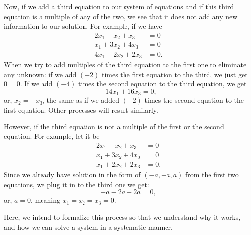 \documentclass[main.tex]{subfiles}
\begin{document}
Now, if we add a third equation to our system of equations and if this third equation is a multiple of any of the two, we see that it does not add any new information to our solution. For example, if we have 
$$\begin{aligned} 2 x_1-x_2+x_3 & =0 \\ 
x_1+3 x_2+4 x_3 & =0\\
4 x_1-2x_2+2x_3 & =0.
\end{aligned}$$
When we try to add multiples of the third equation to the first one to eliminate any unknown: if we add $(-2)$ times the first equation to the third, we just get $0 = 0$. If we add $(-4)$ times the second equation to the third equation, we get
$$
-14x_1+16 x_3=0,
$$
or, $x_2=-x_3$, the same as if we added $(-2)$ times the second equation to the first equation. Other processes will result similarly. 

However, if the third equation is not a multiple of the first or the second equation. For example, let it be 
$$\begin{aligned} 2 x_1-x_2+x_3 & =0 \\ 
x_1+3 x_2+4 x_3 & =0\\
x_1+2x_2+2x_3 & =0.
\end{aligned}$$ 
Since we already have solution in the form of $(-a, -a, a)$ from the first two equations, we plug it in to the third one we get: 
$$-a -2a + 2a = 0,$$
or, $a = 0$, meaning $x_1 = x_2 = x_3 = 0$. 

Here, we intend to formalize this process so that we understand why it works, and how we can solve a system in a systematic manner. 
\end{document}
